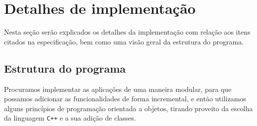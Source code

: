 \documentclass{article}
\begin{document}
\section{Detalhes de implementação}
Nesta seção serão explicados os detalhes da implementação com relação aos itens citados na especificação, bem como uma visão geral da estrutura do programa.

\subsection{Estrutura do programa}
Procuramos implementar as aplicações de uma maneira modular, para que possamos adicionar as funcionalidades de forma incremental, e então utilizamos alguns princípios de programação orientada a objetos, tirando proveito da escolha da linguagem \texttt{C++} e a sua adição de classes.
\end{document}
